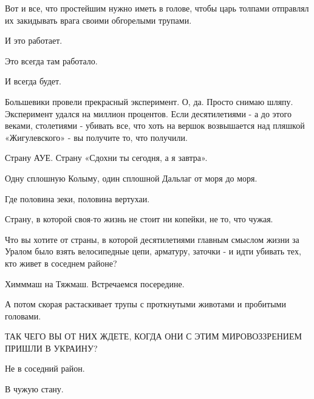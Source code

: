 Вот и все, что простейшим нужно иметь в голове, чтобы царь толпами отправлял их
закидывать врага своими обгорелыми трупами. 

И это работает. 

Это всегда там работало. 

И всегда будет. 

Большевики провели прекрасный эксперимент. О, да. Просто снимаю шляпу.
Эксперимент удался на миллион процентов. Если десятилетиями - а до этого
веками, столетиями - убивать все, что хоть на вершок возвышается над пляшкой
«Жигулевского» - вы получите то, что получили. 

Страну АУЕ. Страну «Сдохни ты сегодня, а я завтра». 

Одну сплошную Колыму, один сплошной Дальлаг от моря до моря. 

Где половина зеки, половина вертухаи.

Страну, в которой своя-то жизнь не стоит ни копейки, не то, что чужая. 

Что вы хотите от страны, в которой десятилетиями главным смыслом жизни за
Уралом было взять велосипедные цепи, арматуру, заточки - и идти убивать тех,
кто живет в соседнем районе? 

Химммаш на Тяжмаш. Встречаемся посередине. 

А потом скорая растаскивает трупы с проткнутыми животами и пробитыми головами. 

ТАК ЧЕГО ВЫ ОТ НИХ ЖДЕТЕ, КОГДА ОНИ С ЭТИМ МИРОВОЗЗРЕНИЕМ ПРИШЛИ В УКРАИНУ?

Не в соседний район.

В чужую стану.
